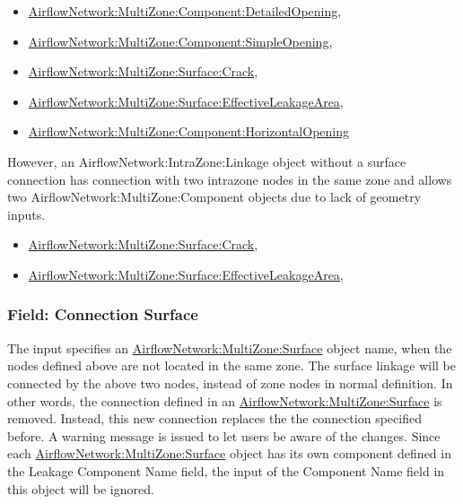 \begin{itemize}
\tightlist
\item
  \hyperref[airflownetworkmultizonecomponentdetailedopening]{AirflowNetwork:MultiZone:Component:DetailedOpening},
\item
  \hyperref[airflownetworkmultizonecomponentsimpleopening]{AirflowNetwork:MultiZone:Component:SimpleOpening},
\item
  \hyperref[airflownetworkmultizonesurfacecrack]{AirflowNetwork:MultiZone:Surface:Crack},
\item
  \hyperref[airflownetworkmultizonesurfaceeffectiveleakagearea]{AirflowNetwork:MultiZone:Surface:EffectiveLeakageArea},
\item
  \hyperref[airflownetworkmultizonecomponenthorizontalopening]{AirflowNetwork:MultiZone:Component:HorizontalOpening}
\end{itemize}

However, an AirflowNetwork:IntraZone:Linkage object without a surface connection has connection with two intrazone nodes in the same zone and allows two AirflowNetwork:MultiZone:Component objects due to lack of geometry inputs.

\begin{itemize}
\tightlist
\item
  \hyperref[airflownetworkmultizonesurfacecrack]{AirflowNetwork:MultiZone:Surface:Crack},
\item
  \hyperref[airflownetworkmultizonesurfaceeffectiveleakagearea]{AirflowNetwork:MultiZone:Surface:EffectiveLeakageArea},
\end{itemize}

\subsubsection{Field: Connection Surface}\label{field-connection-surface}

The input specifies an \hyperref[airflownetworkmultizonesurface]{AirflowNetwork:MultiZone:Surface} object name, when the nodes defined above are not located in the same zone. The surface linkage will be connected by the above two nodes, instead of zone nodes in normal definition. In other words, the connection defined in an \hyperref[airflownetworkmultizonesurface]{AirflowNetwork:MultiZone:Surface} is removed. Instead, this new connection replaces the the connection specified before. A warning message is issued to let users be aware of the changes. Since each \hyperref[airflownetworkmultizonesurface]{AirflowNetwork:MultiZone:Surface} object has its own component defined in the Leakage Component Name field, the input of the Component Name field in this object will be ignored.

